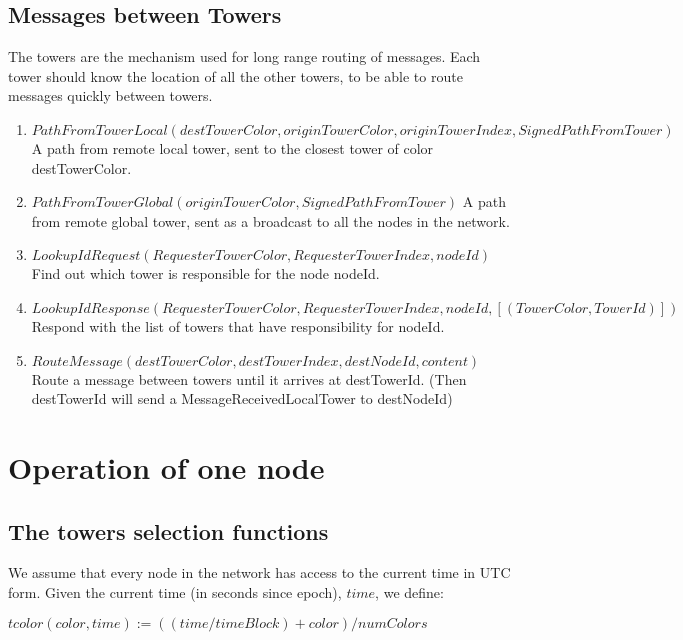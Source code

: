 \documentclass{amsart}
\theoremstyle{definition}
\theoremstyle{remark}
\numberwithin{equation}{section}
\begin{document}
\subsection{Messages between Towers}

The towers are the mechanism used for long range routing of messages.
Each tower should know the location of all the other towers, to be able to route
messages quickly between towers.

\begin{enumerate}
  \item $PathFromTowerLocal(destTowerColor, originTowerColor, originTowerIndex, 
    SignedPathFromTower)$
    A path from remote local tower, sent to the closest tower of color destTowerColor.

  \item $PathFromTowerGlobal(originTowerColor, SignedPathFromTower)$
    A path from remote global tower, sent as a broadcast to all the nodes in the
    network.

  \item $LookupIdRequest(RequesterTowerColor, RequesterTowerIndex, nodeId)$
    Find out which tower is responsible for the node nodeId.

  \item $LookupIdResponse(RequesterTowerColor, RequesterTowerIndex, nodeId, 
    [(TowerColor, TowerId)])$
    Respond with the list of towers that have responsibility for nodeId.

  \item $RouteMessage(destTowerColor, destTowerIndex, destNodeId, content)$
    Route a message between towers until it arrives at destTowerId.
    (Then destTowerId will send a MessageReceivedLocalTower to destNodeId)
\end{enumerate}


\section{Operation of one node}

\subsection{The towers selection functions}

We assume that every node in the network has access to the current time in UTC
form. Given the current time (in seconds since epoch), $time$, we define:

$tcolor(color, time) := ((time / timeBlock) + color) / numColors$
\end{document}
